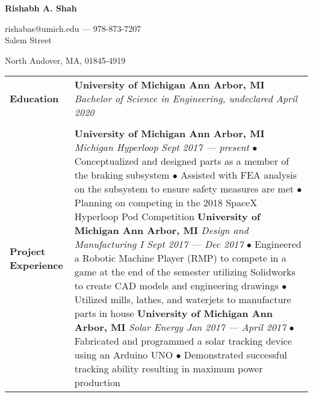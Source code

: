 \documentclass[12pt]{article}
\begin{document}

\begin{center}
{\large\noindent\textbf{Rishabh A. Shah}}

\noindent rishabas@umich.edu --- 978-873-7207 \\

 Salem Street

\noindent North Andover, MA, 01845-4919 \\
\end{center}

\begin{table}[H]
	\centering
	\begin{tabularx}{\textwidth}{@{}X p{6.25in} @{}}
		\textbf{Education} & \textbf{University of Michigan \hfill Ann Arbor, MI} \newline \textit{
		Bachelor of Science in Engineering, undeclared \hfill April 2020}
		\\
		 & \\

		\textbf{Project Experience} & \textbf{University of Michigan \hfill Ann Arbor, MI} \newline \textit{Michigan Hyperloop} \hfill \textit{Sept 2017 --- present} \newline {\small$\bullet$ 
		Conceptualized and designed parts as a member of the braking subsystem \newline $\bullet$ 
		Assisted with FEA analysis on the subsystem to ensure safety measures are met \newline $\bullet$ 
		Planning on competing in the 2018 SpaceX Hyperloop Pod Competition} \newline \textbf{University of Michigan \hfill Ann Arbor, MI} \newline \textit{Design and Manufacturing I \hfill Sept 2017 --- Dec 2017 } \newline {\small$\bullet$ 
		Engineered a Robotic Machine Player (RMP) to compete in a game at the end of the semester utilizing Solidworks to create CAD models and engineering drawings \newline $\bullet$ 
		Utilized mills, lathes, and waterjets to manufacture parts in house} \newline \textbf{University of Michigan \hfill Ann Arbor, MI} \newline \textit{Solar Energy \hfill Jan 2017 --- April 2017} \newline {\small$\bullet$ 
		Fabricated and programmed a solar tracking device using an Arduino UNO \newline $\bullet$ 
		Demonstrated successful tracking ability resulting in maximum power production}\\
		 

\end{tabularx}
\end{table}
\end{document}
